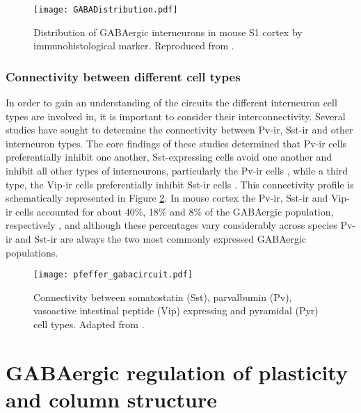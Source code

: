 \begin{figure}
	\centering
        \texttt{[image: GABADistribution.pdf]}
	\caption{Distribution of GABAergic interneurons in mouse S1 cortex
      by immunohistological marker. Reproduced from \cite{Rudy2011}.}
	\label{GABADistribution}
\end{figure}

\subsubsection{Connectivity between different cell types}

In order to gain an understanding of the circuits the different
interneuron cell types are involved in, it is important to consider
their interconnectivity. Several studies have sought to determine the
connectivity between Pv-ir, Sst-ir and other interneuron types. The
core findings of these studies determined that Pv-ir cells
preferentially inhibit one another, Sst-expressing cells avoid one
another and inhibit all other types of interneurons, particularly the
Pv-ir cells \citep{Xu2013}, while a third type, the Vip-ir cells
preferentially inhibit Sst-ir cells \citep{Pfeffer2013}. This
connectivity profile is schematically represented in Figure
\ref{gaba_circuit}. In mouse cortex the Pv-ir, Sst-ir and Vip-ir cells
accounted for about 40\%, 18\% and 8\% of the GABAergic population,
respectively \citep{Xu2010}, and although these percentages vary
considerably across species Pv-ir and Sst-ir are always the two most
commonly expressed GABAergic populations.

\begin{figure}
	\centering
        \texttt{[image: pfeffer\_gabacircuit.pdf]}
	\caption{Connectivity between somatostatin (Sst),
        parvalbumin (Pv), vasoactive intestinal peptide (Vip)
        expressing and pyramidal (Pyr) cell types. Adapted from
        \cite{Pfeffer2013}.}
	\label{gaba_circuit}
\end{figure}

\section{GABAergic regulation of plasticity and column structure}

